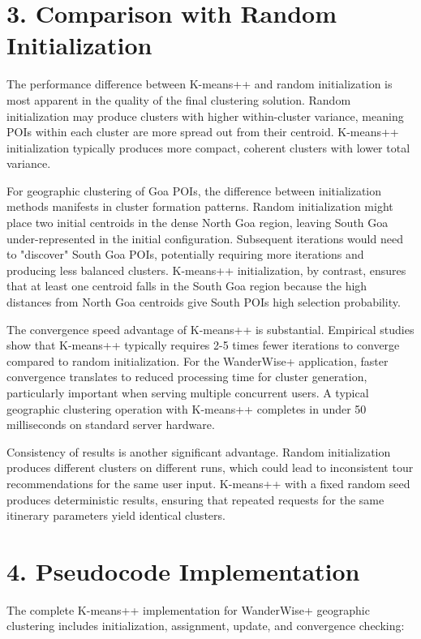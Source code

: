 \section{3. Comparison with Random Initialization}

The performance difference between K-means++ and random initialization is most apparent in the quality of the final clustering solution. Random initialization may produce clusters with higher within-cluster variance, meaning POIs within each cluster are more spread out from their centroid. K-means++ initialization typically produces more compact, coherent clusters with lower total variance.

For geographic clustering of Goa POIs, the difference between initialization methods manifests in cluster formation patterns. Random initialization might place two initial centroids in the dense North Goa region, leaving South Goa under-represented in the initial configuration. Subsequent iterations would need to "discover" South Goa POIs, potentially requiring more iterations and producing less balanced clusters. K-means++ initialization, by contrast, ensures that at least one centroid falls in the South Goa region because the high distances from North Goa centroids give South POIs high selection probability.

The convergence speed advantage of K-means++ is substantial. Empirical studies show that K-means++ typically requires 2-5 times fewer iterations to converge compared to random initialization. For the WanderWise+ application, faster convergence translates to reduced processing time for cluster generation, particularly important when serving multiple concurrent users. A typical geographic clustering operation with K-means++ completes in under 50 milliseconds on standard server hardware.

Consistency of results is another significant advantage. Random initialization produces different clusters on different runs, which could lead to inconsistent tour recommendations for the same user input. K-means++ with a fixed random seed produces deterministic results, ensuring that repeated requests for the same itinerary parameters yield identical clusters.

\section{4. Pseudocode Implementation}

The complete K-means++ implementation for WanderWise+ geographic clustering includes initialization, assignment, update, and convergence checking:

